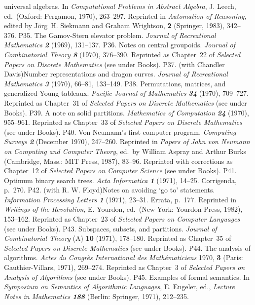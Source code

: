  universal algebras.  In {\sl Compu\-ta\-tional Problems in Abstract
 Algebra}, J. Leech, ed.\ (Oxford:  Pergamon, 1970), 263--297.
 Reprinted in {\sl Automation of Reasoning}, edited by J\"org~H.
 Siekmann and Graham Wrightson, {\bf2} (Springer, 1983), 342--376.
\p P35.  The Gamov-Stern elevator problem.  {\sl Journal of Recreational 
 Mathematics\/ \bf 2} (1969), 131--137.  
\p P36.  Notes on central groupoids.  {\sl Journal of Combinatorial
 Theory\/ \bf 8} (1970), 376--390.  
 Reprinted as Chapter~22 of {\sl Selected Papers on
 Discrete Mathematics\/} (see under Books).
\p P37.  (with Chandler Davis)\xskip  Number representations and dragon
 curves.  {\sl Journal of Recrea\-tional Mathematics\/ \bf 3} (1970),
 66--81, 133--149.  
\p P38.  Permutations, matrices, and generalized Young tableaux. 
 {\sl Pacific Journal of Mathematics\/ \bf 34} (1970), 709--727.
 Reprinted as Chapter~31 of {\sl Selected Papers on
 Discrete Mathematics\/} (see under Books).
\p P39.  A note on solid partitions.  {\sl Mathematics of Computation\/
 \bf 24} (1970), 955--961.  
 Reprinted as Chapter~33 of {\sl Selected Papers on
 Discrete Mathematics\/} (see under Books).
\p P40.  Von Neumann's first computer program.  {\sl Computing
 Surveys\/ \bf 2} (December 1970), 247--260.  Reprinted in {\sl Papers
 of John von Neumann on Computing and Computer Theory}, ed.~by
 William Aspray and Arthur Burks (Cambridge, Mass.: MIT Press, 1987), 83--96.
 Reprinted with corrections as Chapter~12 of {\sl Selected Papers on
 Computer Science\/} (see under Books).
\p P41.  Optimum binary search trees.  {\sl Acta Informatica\/ \bf 1}
 (1971), 14--25.  Corrigenda, p.\ 270.
\p P42.  (with R. W. Floyd)\xskip Notes on avoiding `go to' statements.
 {\sl Information Processing Letters\/ \bf 1} (1971), 23--31.  Errata, p.\ 177.
 Reprinted in {\sl Writings of the Revolution}, E. Yourdon, ed.\ 
 (New York: Yourdon Press, 1982), 153--162.
 Reprinted as Chapter~23 of {\sl Selected Papers on
 Computer Languages\/} (see under Books).
\p P43.  Subspaces, subsets, and partitions.  {\sl Journal of
 Combinatorial Theory\/} (A) {\bf 10} (1971), 178--180.  
 Reprinted as Chapter~35 of {\sl Selected Papers on
 Discrete Mathematics\/} (see under Books).
\p P44.  The analysis of algorithms. {\sl Actes du Congr\`es
 International des Math\'e\-ma\-ticiens\/} 1970, {\bf 3} (Paris:
 Gau\-thier-Villars, 1971), 269--274.  
 Reprinted as Chapter~3 of {\sl Selected Papers on Analysis of Algorithms\/}
 (see under Books).
\p P45.  Examples of formal semantics.  In {\sl Symposium on Semantics of
 Algorithmic Languages}, E. Engeler, ed., {\sl Lecture Notes 
 in Mathematics\/ \bf 188} (Berlin: Springer, 1971), 212--235.  
